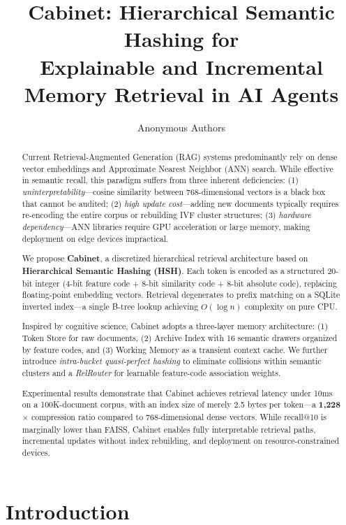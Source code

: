 \documentclass[11pt,a4paper]{article}
\title{\textbf{Cabinet}: Hierarchical Semantic Hashing for\\Explainable and Incremental Memory Retrieval in AI Agents}
\author{Anonymous Authors}
\date{}
\theoremstyle{definition}
\begin{document}
\maketitle

\begin{abstract}
Current Retrieval-Augmented Generation (RAG) systems predominantly rely on dense vector embeddings and Approximate Nearest Neighbor (ANN) search. While effective in semantic recall, this paradigm suffers from three inherent deficiencies: (1) \emph{uninterpretability}---cosine similarity between 768-dimensional vectors is a black box that cannot be audited; (2) \emph{high update cost}---adding new documents typically requires re-encoding the entire corpus or rebuilding IVF cluster structures; (3) \emph{hardware dependency}---ANN libraries require GPU acceleration or large memory, making deployment on edge devices impractical.

We propose \textbf{Cabinet}, a discretized hierarchical retrieval architecture based on \textbf{Hierarchical Semantic Hashing (HSH)}. Each token is encoded as a structured 20-bit integer (4-bit feature code + 8-bit similarity code + 8-bit absolute code), replacing floating-point embedding vectors. Retrieval degenerates to prefix matching on a SQLite inverted index---a single B-tree lookup achieving $O(\log n)$ complexity on pure CPU.

Inspired by cognitive science, Cabinet adopts a three-layer memory architecture: (1) Token Store for raw documents, (2) Archive Index with 16 semantic drawers organized by feature codes, and (3) Working Memory as a transient context cache. We further introduce \emph{intra-bucket quasi-perfect hashing} to eliminate collisions within semantic clusters and a \emph{RelRouter} for learnable feature-code association weights.

Experimental results demonstrate that Cabinet achieves retrieval latency under 10ms on a 100K-document corpus, with an index size of merely 2.5 bytes per token---a \textbf{1,228$\times$} compression ratio compared to 768-dimensional dense vectors. While recall@10 is marginally lower than FAISS, Cabinet enables fully interpretable retrieval paths, incremental updates without index rebuilding, and deployment on resource-constrained devices.
\end{abstract}

\section{Introduction}
\label{sec:intro}
\end{document}
